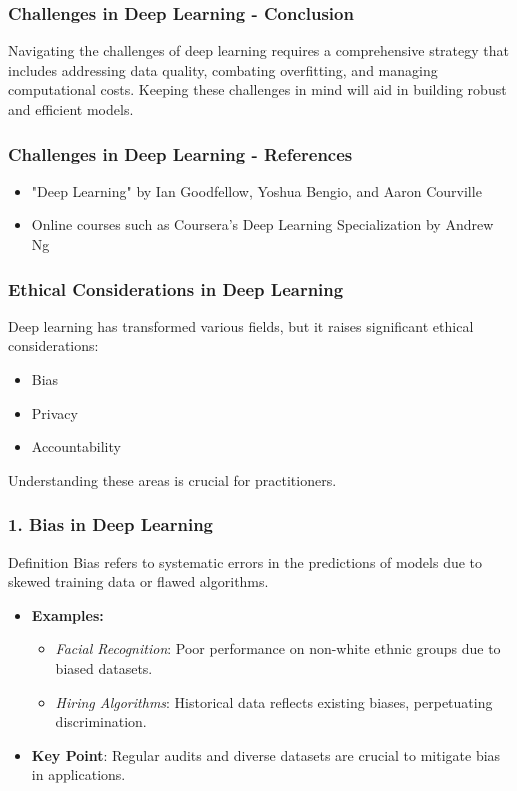 \documentclass{beamer}
\begin{document}
\begin{frame}[fragile]
    \frametitle{Challenges in Deep Learning - Conclusion}
    Navigating the challenges of deep learning requires a comprehensive strategy that includes addressing data quality, combating overfitting, and managing computational costs. Keeping these challenges in mind will aid in building robust and efficient models.
\end{frame}

\begin{frame}[fragile]
    \frametitle{Challenges in Deep Learning - References}
    \begin{itemize}
        \item "Deep Learning" by Ian Goodfellow, Yoshua Bengio, and Aaron Courville
        \item Online courses such as Coursera's Deep Learning Specialization by Andrew Ng
    \end{itemize}
\end{frame}

\begin{frame}[fragile]
    \frametitle{Ethical Considerations in Deep Learning}
    Deep learning has transformed various fields, but it raises significant ethical considerations:
    \begin{itemize}
        \item Bias
        \item Privacy
        \item Accountability
    \end{itemize}
    Understanding these areas is crucial for practitioners.
\end{frame}

\begin{frame}[fragile]
    \frametitle{1. Bias in Deep Learning}
    \begin{block}{Definition}
        Bias refers to systematic errors in the predictions of models due to skewed training data or flawed algorithms.
    \end{block}
    
    \begin{itemize}
        \item \textbf{Examples:}
            \begin{itemize}
                \item \textit{Facial Recognition}: Poor performance on non-white ethnic groups due to biased datasets.
                \item \textit{Hiring Algorithms}: Historical data reflects existing biases, perpetuating discrimination.
            \end{itemize}
        \item \textbf{Key Point}: Regular audits and diverse datasets are crucial to mitigate bias in applications.
    \end{itemize}
\end{frame}
\end{document}

